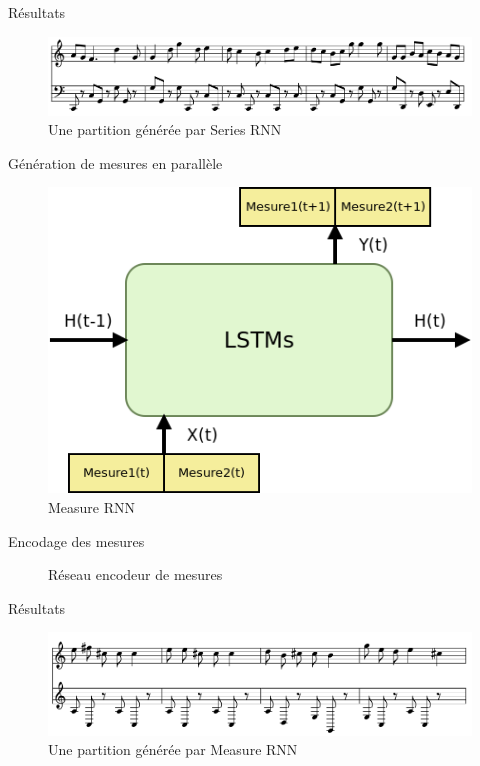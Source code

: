 \documentclass{beamer}
\begin{document}
\begin{frame}{Résultats}
\begin{figure}
\begin{center}
\includegraphics[scale=0.3]{images/series_rnn_result.png}
\caption{Une partition générée par Series RNN}
\end{center}
\end{figure}
\end{frame}

\begin{frame}{Génération de mesures en parallèle}
\begin{figure}
\begin{center}
\includegraphics[scale=0.5]{images/measure_rnn.png}
\caption{Measure RNN}
\end{center}
\end{figure}
\end{frame}

\begin{frame}{Encodage des mesures}
\begin{figure}
\begin{center}

\caption{Réseau encodeur de mesures}
\end{center}
\end{figure}
\end{frame}

\begin{frame}{Résultats}
\begin{figure}
\begin{center}
\includegraphics[scale=0.3]{images/measure_rnn_result.png}
\caption{Une partition générée par Measure RNN}
\end{center}
\end{figure}
\end{frame}
\end{document}
